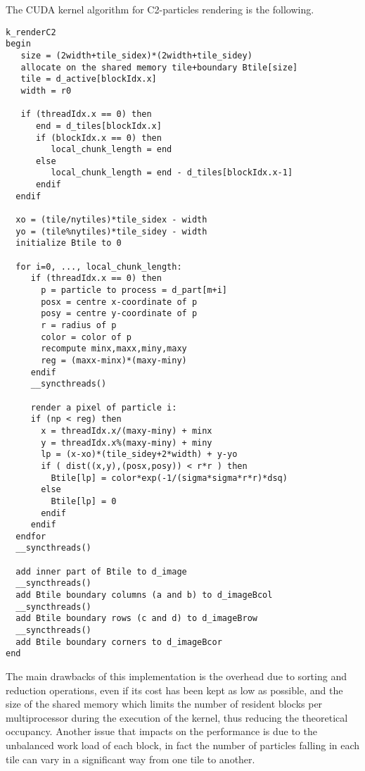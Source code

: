 \documentclass[11pt]{article}
\begin{document}
\normalsize
The CUDA kernel algorithm for C2-particles rendering is the following. 
\small
\begin{verbatim}
k_renderC2
begin
   size = (2width+tile_sidex)*(2width+tile_sidey)
   allocate on the shared memory tile+boundary Btile[size]
   tile = d_active[blockIdx.x] 
   width = r0

   if (threadIdx.x == 0) then
      end = d_tiles[blockIdx.x]
      if (blockIdx.x == 0) then 
         local_chunk_length = end
      else 
         local_chunk_length = end - d_tiles[blockIdx.x-1]
      endif
  endif

  xo = (tile/nytiles)*tile_sidex - width
  yo = (tile%nytiles)*tile_sidey - width
  initialize Btile to 0

  for i=0, ..., local_chunk_length:
     if (threadIdx.x == 0) then
       p = particle to process = d_part[m+i]
       posx = centre x-coordinate of p
       posy = centre y-coordinate of p
       r = radius of p
       color = color of p
       recompute minx,maxx,miny,maxy
       reg = (maxx-minx)*(maxy-miny)
     endif
     __syncthreads()

     render a pixel of particle i:
     if (np < reg) then
       x = threadIdx.x/(maxy-miny) + minx
       y = threadIdx.x%(maxy-miny) + miny
       lp = (x-xo)*(tile_sidey+2*width) + y-yo
       if ( dist((x,y),(posx,posy)) < r*r ) then
         Btile[lp] = color*exp(-1/(sigma*sigma*r*r)*dsq)
       else 
         Btile[lp] = 0
       endif
     endif
  endfor
  __syncthreads()

  add inner part of Btile to d_image 
  __syncthreads()
  add Btile boundary columns (a and b) to d_imageBcol
  __syncthreads()
  add Btile boundary rows (c and d) to d_imageBrow
  __syncthreads()
  add Btile boundary corners to d_imageBcor
end
\end{verbatim}
\normalsize   

The main drawbacks of this implementation is the overhead due to sorting and reduction operations, even if its cost has been kept as low as possible, and the size of the shared memory which limits the number of resident blocks per multiprocessor during the execution of the kernel, thus reducing the theoretical occupancy. Another issue that impacts on the performance is due to the unbalanced work load of each block, in fact the number of particles falling in each tile can vary in a significant way from one tile to another.  
\end{document}
